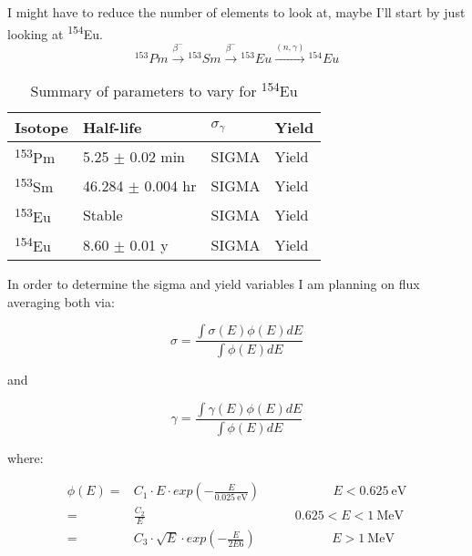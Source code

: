 \documentclass[11pt,notitlepage]{article}
\newcommand{\tss}{\textsuperscript}
\begin{document}
\begin{todolist}
  I might have to reduce the number of elements to look at,
  maybe I'll start by
  just looking at \tss{154}Eu.
  \begin{equation*}
    ^{153}Pm\xrightarrow{\beta^-} {^{153}Sm}\xrightarrow{\beta^-}
    {^{153}Eu}
    \xrightarrow{(n,\gamma)} {^{154}Eu}
  \end{equation*}

  \begin{table}[H]
  \begin{center}
    \caption{Summary of parameters to vary for \tss{154}Eu}
    \label{Table:4}
    \begin{tabular}{l|l|l|l}
      \toprule
      Isotope & Half-life & $\sigma_\gamma$ & Yield\\
      \hline
      \tss{153}Pm & 5.25 $\pm$ 0.02 min & SIGMA & Yield \\
      \tss{153}Sm & 46.284 $\pm$ 0.004 hr & SIGMA & Yield\\
      \tss{153}Eu & Stable & SIGMA & Yield \\
      \tss{154}Eu & 8.60 $\pm$ 0.01 y  & SIGMA & Yield \\
      \bottomrule
    \end{tabular}
  \end{center}
  \end{table}

  In order to determine the sigma and yield variables I am planning on
  flux averaging both via:

  \begin{equation*}
    \sigma=\frac{\int\sigma(E)\phi(E)dE}{\int\phi(E)dE}
  \end{equation*}

  and
  
  \begin{equation*}
    \gamma=\frac{\int\gamma(E)\phi(E)dE}{\int\phi(E)dE}
  \end{equation*}

  where:

  \begin{align*}
    \phi(E) =& C_1\cdot E \cdot exp\left(-\frac{E}{0.025\
      \text{eV}}\right)\ \ \ \ \ \ \ \ \ \ \ \ \ \ \ \ \ \ 
    \ \ \ \ \ \ \ \ E<0.625\ \text{eV}\\
    =& \frac{C_2}{E}\ \ \ \ \ \ \ \ \ \ \ \ \ \ \ \ \ \
    \ \ \ \ \ \ \ \ \ \ \ \ \ \ \ \ \ \ \ \ \ \ \ \ \ \ \ \
    \ \ \ \ \ \ \ 0.625<E<1
    \ \text{MeV}\\
    =& C_3 \cdot \sqrt{E}\cdot exp\left(-\frac{E}{2E6}
    \right)
    \ \ \ \ \ \ \ \ \ \ \ \ \ \ \ \ \ \ \ \ \ \ \ \ \ \ \ E>1\ \text{MeV}
  \end{align*}


\end{todolist}
\end{document}
